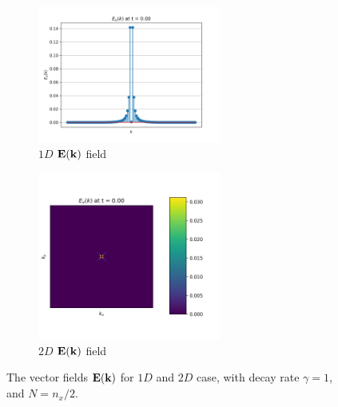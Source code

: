 \begin{figure}[htbp!]
    \begin{subfigure}{7cm}
      \centering\includegraphics[width=6cm]{Code-Figures/sine-vel-prof-1d/EK_spectrum.png}
      \caption{$1D$ $\mathbf{E}(\mathbf{k})$ field}
    \end{subfigure}
    \begin{subfigure}{7cm}
      \centering\includegraphics[width=6cm]{Code-Figures/sine-vel-prof-2d/EK_spectrum.png}
      \caption{$2D$ $\mathbf{E}(\mathbf{k})$ field}
    \end{subfigure}
    \caption{The vector fields $\mathbf{E}(\mathbf{k})$ for $1D$ and $2D$ case, with decay rate $\gamma=1$, and $N=n_x/2$.}
    \label{fig:espec-vector-fields-gamma1}
\end{figure}

